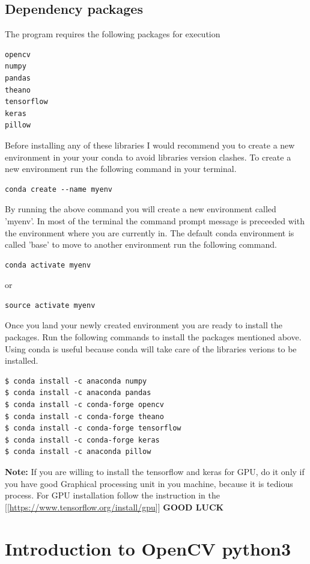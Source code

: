 \documentclass[11pt]{article}
\begin{document}
\subsection*{Dependency packages}
\label{sec-6-4}
The program requires the following packages for execution  
\begin{verbatim}
opencv
numpy
pandas
theano
tensorflow
keras
pillow
\end{verbatim}
Before installing any of these libraries I would recommend you to create a new environment
in your your conda to avoid libraries version clashes. To create a new environment run the following 
command in your terminal.
\begin{verbatim}
conda create --name myenv
\end{verbatim}
By running the above command you will create a new environment called 'myenv'. In most of the terminal
the command prompt message is preceeded with the environment where you are currently in. The default conda 
environment is called 'base' to move to another environment run the following command.
\begin{verbatim}
conda activate myenv
\end{verbatim}
or 
\begin{verbatim}
source activate myenv
\end{verbatim}
Once you land your newly created environment you are ready to install the packages. Run the following commands to install the
packages mentioned above. Using conda is useful because conda will take care of the libraries verions to be installed.  
\begin{verbatim}
$ conda install -c anaconda numpy 
$ conda install -c anaconda pandas 
$ conda install -c conda-forge opencv 
$ conda install -c conda-forge theano 
$ conda install -c conda-forge tensorflow 
$ conda install -c conda-forge keras
$ conda install -c anaconda pillow
\end{verbatim}

\textbf{\textbf{Note:}} If you are willing to install the tensorflow and keras for GPU, do it  
only if you have good Graphical processing unit in you machine, because it is  
tedious process. For GPU installation follow the instruction in the [[\url{https://www.tensorflow.org/install/gpu}]] 
\textbf{\textbf{GOOD LUCK}}
\newpage

\section{Introduction to OpenCV python3}
\label{sec-7}
\end{document}
